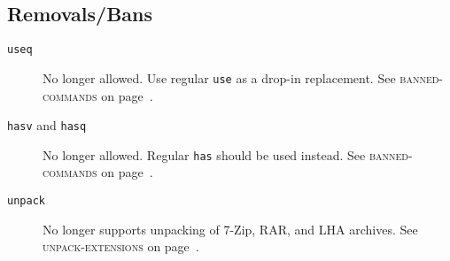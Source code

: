 \documentclass[a4paper,nofoldmark]{leaflet}
\newcommand{\code}[1]{\texttt{#1}}
\newcommand{\featureref}[1]{\textsc{#1} on page~\pageref{feat:#1}}
\begin{document}
\subsection{Removals/Bans}
\label{sec:cs:eapi8-removalsbans}
\begin{description}
    \item[\code{useq}] No longer allowed. Use regular \code{use} as
    a drop-in replacement. See \featureref{banned-commands}.
    \item[\code{hasv} and \code{hasq}] No longer allowed. Regular
    \code{has} should be used instead.
    See \featureref{banned-commands}.
    \item[\code{unpack}] No longer supports unpacking of 7-Zip, RAR,
    and LHA archives. See \featureref{unpack-extensions}.
\end{description}
\end{document}

